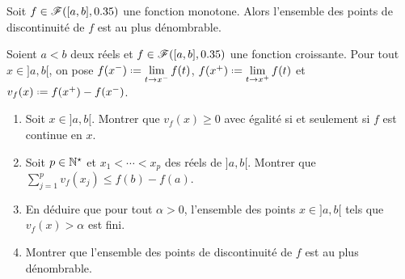 \begin{prop}{}
    Soit $f \in \mathscr{F}([a, b], 0.35)$ une fonction monotone. Alors l'ensemble des points de discontinuité de $f$ est au plus dénombrable. 
\end{prop}

\begin{exercice}
    Soient $a < b$ deux réels et $f \in \mathscr{F}([a, b], 0.35)$ une fonction croissante. Pour tout $x \in ]a, b[$, on pose $f(x^-) \defeq \lim\limits_{t \to x^-} f(t)$, $f(x^+) \defeq \lim\limits_{t \to x^+} f(t)$ et $v_f(x) \defeq f(x^+)-f(x^-)$.
    \begin{enumerate}
        \item Soit $x \in ]a, b[$. Montrer que $v_f(x) \geqslant 0$ avec égalité si et seulement si $f$ est continue en $x$.
        \item Soit $p \in \mathbb{N}^\star$ et $x_1 < \cdots < x_p$ des réels de $]a, b[$. Montrer que $\sum\limits_{j=1}^p v_f(x_j) \leqslant f(b)-f(a)$.
        \item En déduire que pour tout $\alpha > 0$, l'ensemble des points $x \in ]a, b[$ tels que $v_f(x) > \alpha$ est fini. 
        \item Montrer que l'ensemble des points de discontinuité de $f$ est au plus dénombrable. 
    \end{enumerate}
\end{exercice}

